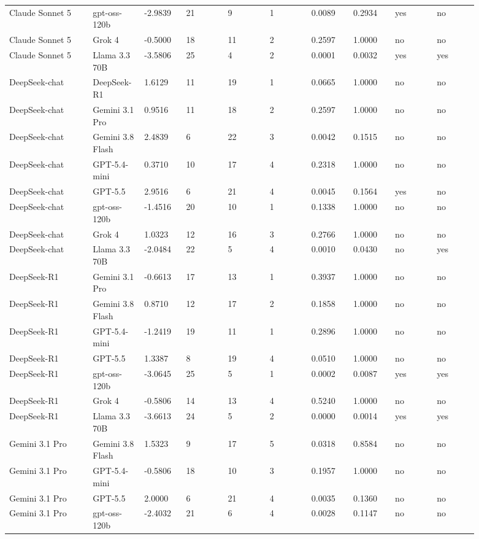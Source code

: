 \begin{landscape}
\begin{longtable}{p{0.162\linewidth}p{0.081\linewidth}p{0.081\linewidth}p{0.081\linewidth}p{0.081\linewidth}p{0.081\linewidth}p{0.081\linewidth}p{0.081\linewidth}p{0.081\linewidth}p{0.081\linewidth}}
Claude Sonnet 5 & gpt-oss-120b & -2.9839 & 21 & 9 & 1 & 0.0089 & 0.2934 & yes & no \\
Claude Sonnet 5 & Grok 4 & -0.5000 & 18 & 11 & 2 & 0.2597 & 1.0000 & no & no \\
Claude Sonnet 5 & Llama 3.3 70B & -3.5806 & 25 & 4 & 2 & 0.0001 & 0.0032 & yes & yes \\
DeepSeek-chat & DeepSeek-R1 & 1.6129 & 11 & 19 & 1 & 0.0665 & 1.0000 & no & no \\
DeepSeek-chat & Gemini 3.1 Pro & 0.9516 & 11 & 18 & 2 & 0.2597 & 1.0000 & no & no \\
DeepSeek-chat & Gemini 3.8 Flash & 2.4839 & 6 & 22 & 3 & 0.0042 & 0.1515 & no & no \\
DeepSeek-chat & GPT-5.4-mini & 0.3710 & 10 & 17 & 4 & 0.2318 & 1.0000 & no & no \\
DeepSeek-chat & GPT-5.5 & 2.9516 & 6 & 21 & 4 & 0.0045 & 0.1564 & yes & no \\
DeepSeek-chat & gpt-oss-120b & -1.4516 & 20 & 10 & 1 & 0.1338 & 1.0000 & no & no \\
DeepSeek-chat & Grok 4 & 1.0323 & 12 & 16 & 3 & 0.2766 & 1.0000 & no & no \\
DeepSeek-chat & Llama 3.3 70B & -2.0484 & 22 & 5 & 4 & 0.0010 & 0.0430 & no & yes \\
DeepSeek-R1 & Gemini 3.1 Pro & -0.6613 & 17 & 13 & 1 & 0.3937 & 1.0000 & no & no \\
DeepSeek-R1 & Gemini 3.8 Flash & 0.8710 & 12 & 17 & 2 & 0.1858 & 1.0000 & no & no \\
DeepSeek-R1 & GPT-5.4-mini & -1.2419 & 19 & 11 & 1 & 0.2896 & 1.0000 & no & no \\
DeepSeek-R1 & GPT-5.5 & 1.3387 & 8 & 19 & 4 & 0.0510 & 1.0000 & no & no \\
DeepSeek-R1 & gpt-oss-120b & -3.0645 & 25 & 5 & 1 & 0.0002 & 0.0087 & yes & yes \\
DeepSeek-R1 & Grok 4 & -0.5806 & 14 & 13 & 4 & 0.5240 & 1.0000 & no & no \\
DeepSeek-R1 & Llama 3.3 70B & -3.6613 & 24 & 5 & 2 & 0.0000 & 0.0014 & yes & yes \\
Gemini 3.1 Pro & Gemini 3.8 Flash & 1.5323 & 9 & 17 & 5 & 0.0318 & 0.8584 & no & no \\
Gemini 3.1 Pro & GPT-5.4-mini & -0.5806 & 18 & 10 & 3 & 0.1957 & 1.0000 & no & no \\
Gemini 3.1 Pro & GPT-5.5 & 2.0000 & 6 & 21 & 4 & 0.0035 & 0.1360 & no & no \\
Gemini 3.1 Pro & gpt-oss-120b & -2.4032 & 21 & 6 & 4 & 0.0028 & 0.1147 & no & no \\

\end{longtable}
\end{landscape}
